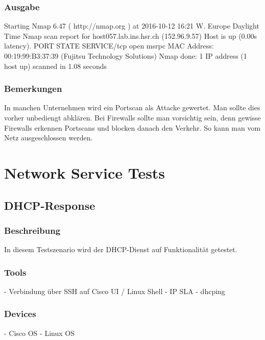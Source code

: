 \documentclass[a4,12pt]{scrartcl}
\begin{document}
\subsubsection{Ausgabe}
Starting Nmap 6.47 ( http://nmap.org ) at 2016-10-12 16:21 W. Europe Daylight Time\newline
Nmap scan report for host057.lab.ins.hsr.ch (152.96.9.57)\newline
Host is up (0.00s latency).\newline
PORT    STATE SERVICE/tcp open  msrpc\newline
MAC Address: 00:19:99:B3:37:39 (Fujitsu Technology Solutions)\newline
Nmap done: 1 IP address (1 host up) scanned in 1.08 seconds\newline
\subsubsection{Bemerkungen}
In manchen Unternehmen wird ein Portscan als Attacke gewertet. Man sollte dies vorher unbediengt abklären.
Bei Firewalls sollte man vorsichtig sein, denn gewisse Firewalls erkennen Portscans und blocken danach den Verkehr. So kann man vom Netz ausgeschlossen werden.



\newpage
\section{Network Service Tests}
\subsection{DHCP-Response}
\subsubsection{Beschreibung}
In diesem Testszenario wird der DHCP-Dienst auf Funktionalität getestet.
\subsubsection{Tools}
- Verbindung über SSH auf Cisco UI / Linux Shell\newline
- IP SLA\newline
- dhcping\newline
\subsubsection{Devices}
- Cisco OS\newline
- Linux OS\newline
\end{document}
